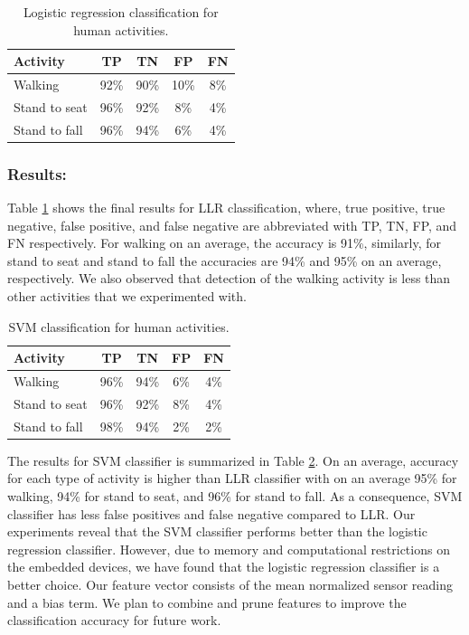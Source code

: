 \documentclass[letterpaper]{article}
\begin{document}
\begin{sloppy}
 \begin{table}[!ht]
\caption{Logistic regression classification for human activities.}
	\label{tab:human-logistic-class}
	\centering
		\begin{tabular} {|l |c |c |c|c|}
			\hline
			{\bf Activity} & {\bf  TP}  &	{\bf TN}  &	{\bf FP} &	{\bf FN} \\ 
			\hline
			Walking	& 92\%	& 90\%	& 10\%	& 8\% \\ \hline
			Stand to seat	& 96\%	& 92\%	& 8\% & 	4\%	 \\ \hline 
			Stand to fall	& 96\%	& 94\%	& 6\%	& 4\%	 \\ \hline
		\end{tabular}
\end{table}


\subsubsection{Results:} Table \ref{tab:human-logistic-class} shows the final results for 
LLR classification, where, true positive, true negative, false positive, and false negative are 
abbreviated with TP, TN, FP, and FN respectively. For walking on an average, the accuracy is 91\%, 
similarly, for stand to seat and stand to fall the accuracies are 94\% and 95\% on an 
average, respectively. We also observed that detection of the walking activity is less than other 
activities that we experimented with.  

\begin{table}[!ht]
\caption{SVM classification for human activities.}
	\label{tab:human-svm-class}
	\centering
		\begin{tabular} {|l |c |c |c|c|}
			\hline
			{\bf Activity} & {\bf  TP}  &	{\bf TN}  &	{\bf FP} &	{\bf FN} \\ 
			\hline
			Walking	& 96\%	& 94\%	& 6\%	& 4\% \\ \hline
			Stand to seat	& 96\%	& 92\%	& 8\% & 	4\%	 \\ \hline 
			Stand to fall	& 98\%	& 94\%	& 2\%	& 2\%	 \\ \hline
		\end{tabular}
\end{table}


The results for SVM classifier is summarized in Table \ref{tab:human-svm-class}. On an average, 
accuracy for each type of activity is higher than LLR classifier with on an average 95\% for 
walking, 94\% for stand to seat, and 96\% for stand to fall. As a consequence, SVM classifier has 
less false positives and false negative compared to LLR.  Our experiments reveal that the SVM 
classifier performs better than the logistic regression classifier. However, due to memory and 
computational restrictions on the embedded devices, we have found that the logistic 
regression classifier is a better choice.  Our feature vector consists of the mean normalized sensor 
reading and a bias term. We plan to combine and prune features to improve the classification 
accuracy for future work.  



\end{sloppy}
\end{document}
